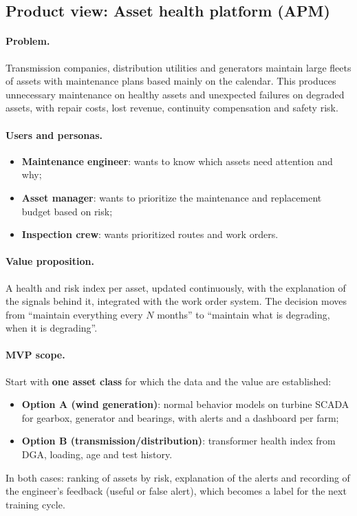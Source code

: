 \documentclass[10pt,a4paper,oneside]{article}
\newcommand{\visaoproduto}[1]{%
  \let\subsectionmarkbase\subsectionmark
  \renewcommand{\subsectionmark}[1]{\markright{\thesubsection\ Product view}}%
  \subsection{Product view: #1}%
  \let\subsectionmark\subsectionmarkbase}
\begin{document}
\visaoproduto{Asset health platform (APM)}

\paragraph{Problem.}
Transmission companies, distribution utilities and generators maintain large
fleets of assets with maintenance plans based mainly on the calendar. This
produces unnecessary maintenance on healthy assets and unexpected failures
on degraded assets, with repair costs, lost revenue, continuity compensation
and safety risk.

\paragraph{Users and personas.}
\begin{itemize}
  \item \textbf{Maintenance engineer}: wants to know which assets need
    attention and why;
  \item \textbf{Asset manager}: wants to prioritize the maintenance and
    replacement budget based on risk;
  \item \textbf{Inspection crew}: wants prioritized routes and work orders.
\end{itemize}

\paragraph{Value proposition.}
A health and risk index per asset, updated continuously, with the
explanation of the signals behind it, integrated with the work order system.
The decision moves from ``maintain everything every $N$ months'' to
``maintain what is degrading, when it is degrading''.

\paragraph{MVP scope.}
Start with \textbf{one asset class} for which the data and the value are
established:
\begin{itemize}
  \item \textbf{Option A (wind generation)}: normal behavior models on
    turbine SCADA for gearbox, generator and bearings, with alerts and a
    dashboard per farm;
  \item \textbf{Option B (transmission/distribution)}: transformer health
    index from DGA, loading, age and test history.
\end{itemize}
In both cases: ranking of assets by risk, explanation of the alerts and
recording of the engineer's feedback (useful or false alert), which becomes
a label for the next training cycle.
\end{document}
